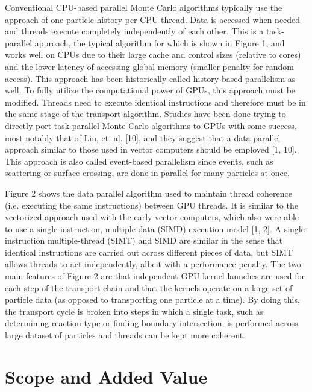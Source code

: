 Conventional CPU-based parallel Monte Carlo algorithms typically use the approach of one particle history per CPU thread.  Data is accessed when needed and threads execute completely independently of each other.  This is a task-parallel approach, the typical algorithm for which is shown in Figure 1, and works well on CPUs due to their large cache and control sizes (relative to cores) and the lower latency of accessing global memory (smaller penalty for random access).  This approach has been historically called history-based parallelism as well.  To fully utilize the computational power of GPUs, this approach must be modified.  Threads need to execute identical instructions and therefore must be in the same stage of the transport algorithm.  Studies have been done trying to directly port task-parallel Monte Carlo algorithms to GPUs with some success, most notably that of Liu, et. al. [10], and they suggest that a data-parallel approach similar to those used in vector computers should be employed [1, 10].  This approach is also called event-based parallelism since events, such as scattering or surface crossing, are done in parallel for many particles at once.

Figure 2 shows the data parallel algorithm used to maintain thread coherence (i.e. executing the same instructions) between GPU threads.  It is similar to the vectorized approach used with the early vector computers, which also were able to use a single-instruction, multiple-data (SIMD) execution model [1, 2].  A single-instruction multiple-thread (SIMT) and SIMD are similar in the sense that identical instructions are carried out across different pieces of data, but SIMT allows threads to act independently, albeit with a performance penalty.   The two main features of Figure 2 are that independent GPU kernel launches are used for each step of the transport chain and that the kernels operate on a large set of particle data (as opposed to transporting one particle at a time).  By doing this, the transport cycle is broken into steps in which a single task, such as determining reaction type or finding boundary intersection, is performed across large dataset of particles and threads can be kept more coherent.

\section{Scope and Added Value}

